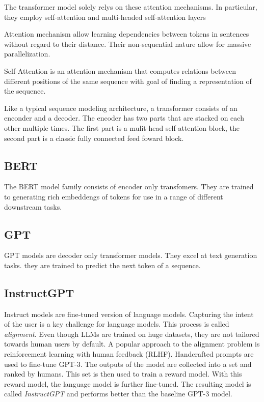 \documentclass[english, version-2022-01]{uzl-thesis}
\begin{document}
The transformer model \cite{NIPS2017_3f5ee243} solely relys on these attention mechanisms. In particular, they employ self-attention and multi-headed self-attention layers

Attention mechanism allow learning dependencies between tokens in sentences without regard to their distance. Their non-sequential nature allow for massive parallelization.

Self-Attention is an attention mechanism that computes relations between different positions of the same sequence with goal of finding a representation of the sequence.

Like a typical sequence modeling architecture, a transformer consists of an enconder and a decoder. The encoder has two parts that are stacked on each other multiple times. The first part is a mulit-head self-attention block, the second part is a classic fully connected feed foward block.

\subsection{BERT}

The BERT model family consists of encoder only transfomers. They are trained to generating rich embeddengs of tokens for use in a range of different downstream tasks.

\subsection{GPT}

GPT models are decoder only transformer models. They excel at text generation tasks. they are trained to predict the next token of a sequence.
\subsection{InstructGPT}

Instruct models are fine-tuned version of language models.
Capturing the intent of the user is a key challenge for language models. This process is called \textit{alignment}. Even though LLMs are trained on huge datasets, they are not tailored towards human users by default. A popular approach to the alignment problem is reinforcement learning with human feedback (RLHF). Handcrafted prompts are used to fine-tune GPT-3. The outputs of the model are collected into a set and ranked by humans. This set is then used to train a reward model. With this reward model, the language model is further fine-tuned. The resulting model is called \textit{InstructGPT} and performs better than the baseline GPT-3 model.
\end{document}
